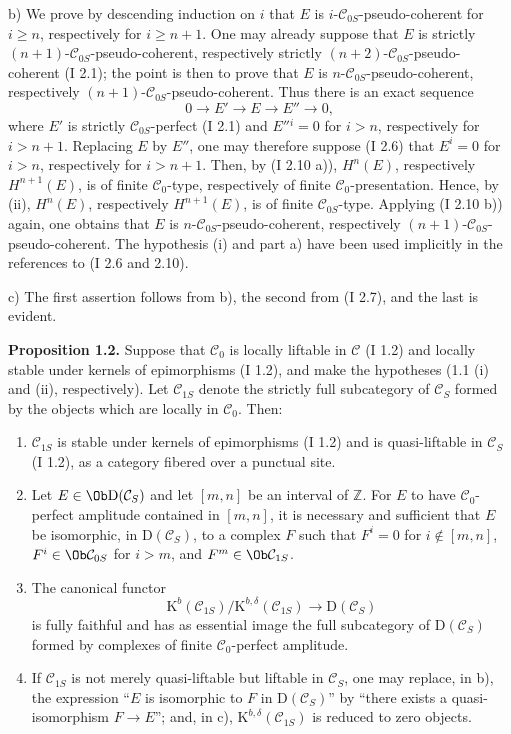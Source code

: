 \documentclass[11pt]{article}
\begin{document}
b) We prove by descending induction on $i$ that $E$ is $i$-$\mathcal C_{0S}$-pseudo-coherent for $i\ge n$, respectively for $i\ge n+1$. One may already suppose that $E$ is strictly $(n+1)$-$\mathcal C_{0S}$-pseudo-coherent, respectively strictly $(n+2)$-$\mathcal C_{0S}$-pseudo-coherent (I 2.1); the point is then to prove that $E$ is $n$-$\mathcal C_{0S}$-pseudo-coherent, respectively $(n+1)$-$\mathcal C_{0S}$-pseudo-coherent. Thus there is an exact sequence
\[
0\longrightarrow E'\longrightarrow E\longrightarrow E''\longrightarrow0,
\]
where $E'$ is strictly $\mathcal C_{0S}$-perfect (I 2.1) and $E''{}^i=0$ for $i>n$, respectively for $i>n+1$. Replacing $E$ by $E''$, one may therefore suppose (I 2.6) that $E^i=0$ for $i>n$, respectively for $i>n+1$. Then, by (I 2.10 a)), $H^n(E)$, respectively $H^{n+1}(E)$, is of finite $\mathcal C_0$-type, respectively of finite $\mathcal C_0$-presentation. Hence, by (ii), $H^n(E)$, respectively $H^{n+1}(E)$, is of finite $\mathcal C_{0S}$-type. Applying (I 2.10 b)) again, one obtains that $E$ is $n$-$\mathcal C_{0S}$-pseudo-coherent, respectively $(n+1)$-$\mathcal C_{0S}$-pseudo-coherent. The hypothesis (i) and part a) have been used implicitly in the references to (I 2.6 and 2.10).

c) The first assertion follows from b), the second from (I 2.7), and the last is evident.

\textbf{Proposition 1.2.} Suppose that $\mathcal C_0$ is locally liftable in $\mathcal C$ (I 1.2) and locally stable under kernels of epimorphisms (I 1.2), and make the hypotheses (1.1 (i) and (ii), respectively). Let $\mathcal C_{1S}$ denote the strictly full subcategory of $\mathcal C_S$ formed by the objects which are locally in $\mathcal C_0$. Then:
\begin{enumerate}[label=\alph*)]
\item $\mathcal C_{1S}$ is stable under kernels of epimorphisms (I 1.2) and is quasi-liftable in $\mathcal C_S$ (I 1.2), as a category fibered over a punctual site.
\item Let $E\in\Ob\mathrm D(\mathcal C_S)$ and let $[m,n]$ be an interval of $\mathbb Z$. For $E$ to have $\mathcal C_0$-perfect amplitude contained in $[m,n]$, it is necessary and sufficient that $E$ be isomorphic, in $\mathrm D(\mathcal C_S)$, to a complex $F$ such that $F^i=0$ for $i\notin[m,n]$, $F^i\in\Ob\mathcal C_{0S}$ for $i>m$, and $F^m\in\Ob\mathcal C_{1S}$.
\item The canonical functor
\[
\mathrm K^b(\mathcal C_{1S})/\mathrm K^{b,\delta}(\mathcal C_{1S})
\longrightarrow \mathrm D(\mathcal C_S)
\]
is fully faithful and has as essential image the full subcategory of $\mathrm D(\mathcal C_S)$ formed by complexes of finite $\mathcal C_0$-perfect amplitude.
\item If $\mathcal C_{1S}$ is not merely quasi-liftable but liftable in $\mathcal C_S$, one may replace, in b), the expression ``$E$ is isomorphic to $F$ in $\mathrm D(\mathcal C_S)$'' by ``there exists a quasi-isomorphism $F\to E$''; and, in c), $\mathrm K^{b,\delta}(\mathcal C_{1S})$ is reduced to zero objects.
\end{enumerate}
\end{document}
